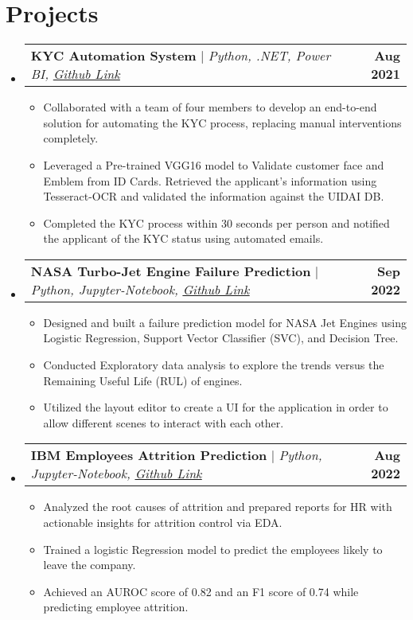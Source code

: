\documentclass[letterpaper,11pt]{article}
\makeatletter
\newcommand{\resumeItem}[1]{
  \item\small{
    {#1 \vspace{-2pt}}
  }
}
\newcommand{\resumeProjectHeading}[2]{
    \item
    \begin{tabular*}{1.001\textwidth}{l@{\extracolsep{\fill}}r}
      \small#1 & \textbf{\small #2}\\
    \end{tabular*}\vspace{-7pt}
}
\newcommand{\resumeSubHeadingListStart}{\begin{itemize}[leftmargin=0.0in, label={}]}
\newcommand{\resumeSubHeadingListEnd}{\end{itemize}}
\newcommand{\resumeItemListStart}{\begin{itemize}}
\newcommand{\resumeItemListEnd}{\end{itemize}\vspace{-5pt}}
\makeatother
\begin{document}
\section{Projects}
    \vspace{-5pt}
    \resumeSubHeadingListStart
      \resumeProjectHeading
          {\textbf{KYC Automation System} $|$ \emph{Python, .NET, Power BI, \href{https://github.com/Sha661nk/KYC-Automation} {\underline{Github Link}}}}  {Aug 2021}
          \resumeItemListStart
            \resumeItem{Collaborated with a team of four members to develop an end-to-end solution for automating the KYC process, replacing manual interventions completely.}
            \resumeItem{Leveraged a Pre-trained VGG16 model to Validate customer face and Emblem from ID Cards. Retrieved the applicant’s information using Tesseract-OCR and validated the information against the UIDAI DB.}
            \resumeItem{Completed the KYC process within 30 seconds per person and notified the applicant of the KYC status using automated emails.}
          \resumeItemListEnd
          \vspace{-16pt}
      \resumeProjectHeading
          {\textbf{NASA Turbo-Jet Engine Failure Prediction} $|$ \emph{Python, Jupyter-Notebook, \href{https://github.com/Sha661nk/Nasa-Turbo-Jet-Engine-Failure-Prediction} {\underline{Github Link}}}}{Sep 2022}
          \resumeItemListStart
            \resumeItem{Designed and built a failure prediction model for NASA Jet Engines using Logistic Regression, Support Vector Classifier (SVC), and Decision Tree.}
            \resumeItem{Conducted Exploratory data analysis to explore the trends versus the Remaining Useful Life (RUL) of engines.}
            \resumeItem{Utilized the layout editor to create a UI for the application in order to allow different scenes to interact with each other.}
          \resumeItemListEnd 
          \vspace{-16pt}
          \resumeProjectHeading
          {\textbf{IBM Employees Attrition Prediction} $|$ \emph{Python, Jupyter-Notebook, \href{https://github.com/Sha661nk/Attrition-Rate-Prediction} {\underline{Github Link}}}}{Aug 2022}
          \resumeItemListStart
            \resumeItem{Analyzed the root causes of attrition and prepared reports for HR with actionable insights for attrition control via EDA.}
            \resumeItem{Trained a logistic Regression model to predict the employees likely to leave the company.}
            \resumeItem{Achieved an AUROC score of 0.82 and an F1 score of 0.74 while predicting employee attrition.}
          \resumeItemListEnd 
    \resumeSubHeadingListEnd
\vspace{-12pt}
\end{document}
